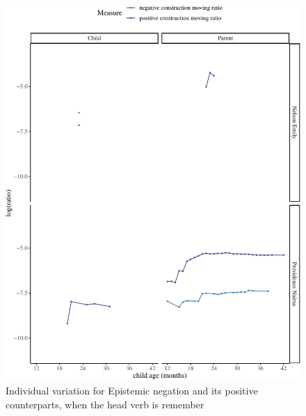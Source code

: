 \documentclass[
  english,
  man,floatsintext]{apa6}
\begin{document}
\begin{figure}[H]

{\centering \includegraphics{neg_construction_article_files/figure-latex/individualepistemicremember-1} 

}

\caption{Individual variation for Epistemic negation and its positive counterparts, when the head verb is remember}\label{fig:individualepistemicremember}
\end{figure}
\end{document}
